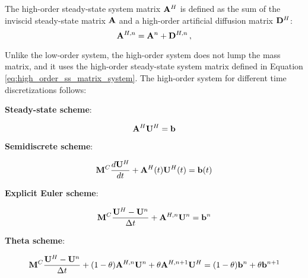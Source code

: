 The high-order steady-state system matrix $\highorderssmatrix$ is defined as
the sum of the inviscid steady-state matrix $\ssmatrix$ and a high-order
artificial diffusion matrix $\highorderdiffusionmatrix$:
\begin{equation}\label{eq:high_order_ss_matrix_system}
  \highorderssmatrix[\timeindex] = \ssmatrix^\timeindex
  + \highorderdiffusionmatrix[\timeindex] \eqc
\end{equation}

Unlike the low-order system, the high-order system does not lump the
mass matrix, and it uses the high-order steady-state system matrix
defined in Equation \eqref{eq:high_order_ss_matrix_system}. The high-order
system for different time discretizations follows:
\begin{center}{\textbf{Steady-state scheme}:}\end{center}
\begin{equation}\label{eq:high_ss_system}
   \highorderssmatrix\highordersolution = \ssrhs
\end{equation}
\begin{center}{\textbf{Semidiscrete scheme}:}\end{center}
\begin{equation}\label{eq:high_semidiscrete_system}
   \consistentmassmatrix\ddt{\highordersolution}
    + \highorderssmatrix(\timevalue)\highordersolution(\timevalue) 
    = \ssrhs(\timevalue)
\end{equation}
\begin{center}{\textbf{Explicit Euler scheme}:}\end{center}
\begin{equation}\label{eq:high_FE_system}
  \consistentmassmatrix\frac{\highordersolution-\solutionvector^{\timeindex}}
  {\timestepsize}
  + \highorderssmatrix[\timeindex]\solutionvector^{\timeindex}
  = \ssrhs^\timeindex
\end{equation}
\begin{center}{\textbf{Theta scheme}:}\end{center}
\begin{equation}\label{eq:high_theta_system}
  \consistentmassmatrix\frac{\highordersolution-\solutionvector^\timeindex}
  {\timestepsize}
  + (1-\theta)\highorderssmatrix[\timeindex]\solutionvector^\timeindex
  + \theta\highorderssmatrix[\timeindex+1]\highordersolution
  = (1-\theta)\ssrhs^\timeindex + \theta\ssrhs^{\timeindex+1}
\end{equation}
